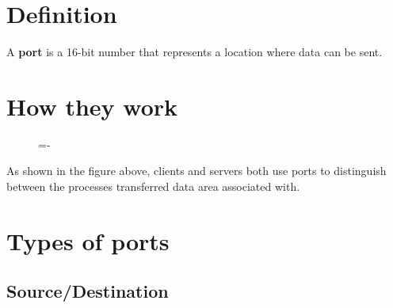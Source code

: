 \documentclass[a4paper]{systems-software}
\begin{document}
\section*{Definition}

A \textbf{port} is a 16-bit number that represents a location where data can be sent.


\section*{How they work}

\begin{figure}[H]
	\lineskip=-\fboxrule
\end{figure}

As shown in the figure above, clients and servers both use ports to distinguish between the processes transferred data area associated with.


\section*{Types of ports}

\subsection*{Source/Destination}
\end{document}
